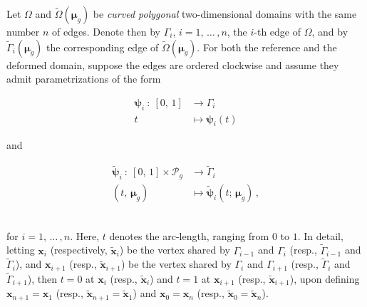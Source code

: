 \documentclass[12pt, a4paper, twoside, openright, notitlepage]{report}
\numberwithin{equation}{chapter}
\theoremstyle{theorem}
\theoremstyle{definition}
\theoremstyle{remark}
\theoremstyle{proposition}
\numberwithin{figure}{chapter}
\newcommand{\wt}[1]{\widetilde{#1}}
\newcommand{\bg}[1]{\boldsymbol{#1}}
\begin{document}
		Let $\Omega$ and $\wt{\Omega}(\bg{\mu}_g)$ be \emph{curved polygonal} two-dimensional domains with the same number $n$ of edges. Denote then by $\Gamma_i$, $i = 1, \, \ldots \, , n$, the $i$-th edge of $\Omega$, and by $\wt{\Gamma}_i(\bg{\mu}_g)$ the corresponding edge of $\wt{\Omega}(\bg{\mu}_g)$. For both the reference and the deformed domain, suppose the edges are ordered clockwise and assume they admit parametrizations of the form \\[0.2cm]
		\hspace*{1.75cm}\begin{minipage}{0.35\textwidth}
			\begin{equation*}
				\begin{aligned}
					\bg{\psi}_i ~ : ~ [0, \, 1] & \rightarrow \Gamma_i \\
					t & \mapsto \bg{\psi}_i(t)
				\end{aligned}
			\end{equation*}
		\end{minipage}
		and
		\begin{minipage}{0.45\textwidth}
			\begin{equation*}
				\begin{aligned}
					\wt{\bg{\psi}}_i ~ : ~ [0, \, 1] \times \mathcal{P}_g & \rightarrow \wt{\Gamma}_i \\
					(t, \, \bg{\mu}_g) & \mapsto \wt{\bg{\psi}}_i(t; \, \bg{\mu}_g) \, ,
				\end{aligned}
			\end{equation*}
		\end{minipage} \\[0.2cm]
		for $i = 1, \, \ldots \, , n$. Here, $t$ denotes the arc-length, ranging from $0$ to $1$. In detail, letting $\bg{x}_i$ (respectively, $\wt{\bg{x}}_i$) be the vertex shared by $\Gamma_{i-1}$ and $\Gamma_i$ (resp., $\wt{\Gamma}_{i-1}$ and $\wt{\Gamma}_i$), and $\bg{x}_{i+1}$ (resp., $\wt{\bg{x}}_{i+1}$) be the vertex shared by $\Gamma_i$ and $\Gamma_{i+1}$ (resp., $\wt{\Gamma}_i$ and $\wt{\Gamma}_{i+1}$), then $t = 0$ at $\bg{x}_i$ (resp., $\wt{\bg{x}}_i$) and $t = 1$ at $\bg{x}_{i+1}$ (resp., $\wt{\bg{x}}_{i+1}$), upon defining $\bg{x}_{n+1} = \bg{x}_1$ (resp., $\wt{\bg{x}}_{n+1} = \wt{\bg{x}}_1$) and $\bg{x}_0 = \bg{x}_n$ (resp., $\wt{\bg{x}}_0 = \wt{\bg{x}}_n$).
		
\end{document}
